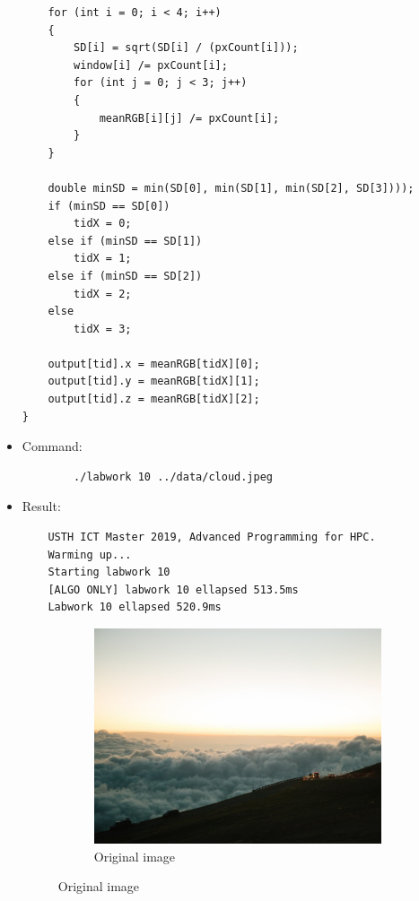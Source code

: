 \documentclass{article}
\begin{document}
\begin{itemize}
\begin{verbatim}
    for (int i = 0; i < 4; i++)
    {
        SD[i] = sqrt(SD[i] / (pxCount[i]));
        window[i] /= pxCount[i];
        for (int j = 0; j < 3; j++)
        {
            meanRGB[i][j] /= pxCount[i];
        }
    }

    double minSD = min(SD[0], min(SD[1], min(SD[2], SD[3])));
    if (minSD == SD[0])
        tidX = 0;
    else if (minSD == SD[1])
        tidX = 1;
    else if (minSD == SD[2])
        tidX = 2;
    else
        tidX = 3;

    output[tid].x = meanRGB[tidX][0];
    output[tid].y = meanRGB[tidX][1];
    output[tid].z = meanRGB[tidX][2];
}
    \end{verbatim}
    
    \item Command:
    \begin{verbatim}
        ./labwork 10 ../data/cloud.jpeg 
    \end{verbatim}
    \item Result:
    \begin{verbatim}
    USTH ICT Master 2019, Advanced Programming for HPC.
    Warming up...
    Starting labwork 10
    [ALGO ONLY] labwork 10 ellapsed 513.5ms
    Labwork 10 ellapsed 520.9ms
    \end{verbatim}
    \begin{figure}[h]
      \centering
      \begin{subfigure}{.45\textwidth}
        \includegraphics[width=\linewidth]{./result/cloud.jpeg}
        \caption{Original image}
      \end{subfigure}
      \hspace{1cm}

\end{figure}
\end{itemize}
\end{document}
